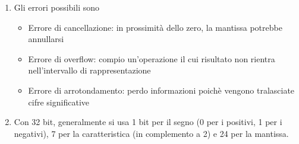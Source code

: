 \documentclass[a4paper,11pt]{article}
\begin{document}
\begin{enumerate}
	\item Gli errori possibili sono
	\begin{itemize}
		\item Errore di cancellazione: in prossimità dello zero, la mantissa potrebbe annullarsi
		\item Errore di overflow: compio un'operazione il cui risultato non rientra nell'intervallo di rappresentazione
		\item Errore di arrotondamento: perdo informazioni poichè vengono tralasciate cifre significative
	\end{itemize}
	\item Con 32 bit, generalmente si usa 1 bit per il segno (0 per i positivi, 1 per i negativi), 7 per la caratteristica (in complemento a 2) e 24 per la mantissa.
\end{enumerate}
\end{document}
